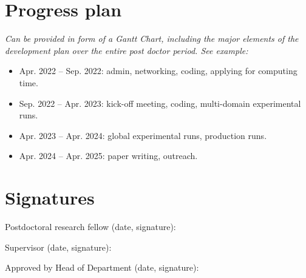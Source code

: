 \documentclass{article}
\newcommand{\guideline}[1]{{\color{color2}\itshape{#1}}}
\begin{document}
\section{Progress plan}

    \guideline{
        Can be provided in form of a Gantt Chart, including the major elements
        of the development plan over the entire post doctor period. See
        example:}

    \begin{itemize}
      \item Apr. 2022 -- Sep. 2022: admin, networking, coding, applying for
        computing time.
      \item Sep. 2022 -- Apr. 2023: kick-off meeting, coding, multi-domain
        experimental runs.
      \item Apr. 2023 -- Apr. 2024: global experimental runs, production runs.
      \item Apr. 2024 -- Apr. 2025: paper writing, outreach.
    \end{itemize}

\section{Signatures}

    Postdoctoral research fellow (date, signature):

    Supervisor (date, signature):

    Approved by Head of Department (date, signature):


\end{document}
